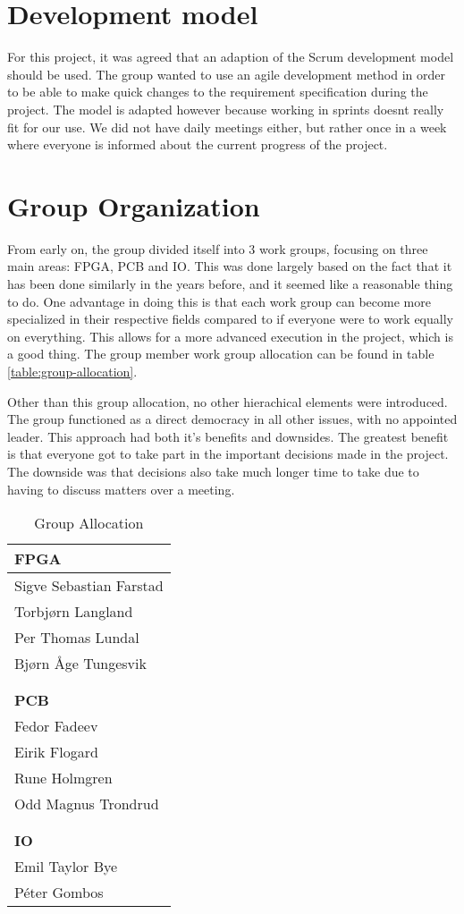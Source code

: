 \section{Development model}
For this project, it was agreed that an adaption of the Scrum development model should be used. The group wanted
to use an agile development method in order to be able to make quick changes to the requirement specification during the project.
The model is adapted however because working in sprints doesnt really fit for our use. We did not have daily meetings either, but rather
once in a week where everyone is informed about the current progress of the project.
\section{Group Organization}

From early on, the group divided itself into 3 work groups, focusing on three main areas: FPGA, PCB and IO.
This was done largely based on the fact that it has been done similarly in the years before\cn, and it seemed like a reasonable thing to do.
One advantage in doing this is that each work group can become more specialized in their respective fields compared to if everyone were to work equally on everything.
This allows for a more advanced execution in the project, which is a good thing.
The group member work group allocation can be found in table \vref{table:group-allocation}.

Other than this group allocation, no other hierachical elements were introduced.
The group functioned as a direct democracy in all other issues, with no appointed leader. This approach had both
it's benefits and downsides. The greatest benefit is that everyone got to take part in the important decisions made in the project.
The downside was that decisions also take much longer time to take due to having to discuss matters over a meeting.


\begin{table}[H]
\begin{center}
\begin{tabular}{l}
\textbf{FPGA} \\
\hline
Sigve Sebastian Farstad \\
Torbjørn Langland \\
Per Thomas Lundal \\
Bjørn Åge Tungesvik \\
\\
\\
\textbf{PCB} \\
\hline
Fedor Fadeev \\
Eirik Flogard \\
Rune Holmgren \\
Odd Magnus Trondrud \\
\\
\\
\textbf{IO} \\
\hline
Emil Taylor Bye \\
Péter Gombos \\
\end{tabular}
\caption{Group Allocation}
\label{table:group-allocation}
\end{center}
\end{table}

